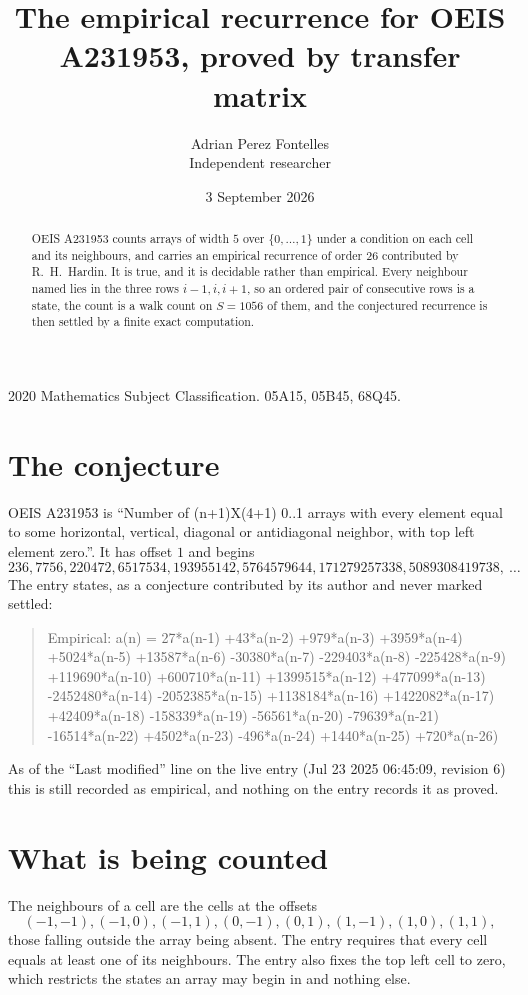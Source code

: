\documentclass[11pt,a4paper]{article}
\title{The empirical recurrence for OEIS A231953, proved by transfer matrix}
\author{Adrian Perez Fontelles\\ \small Independent researcher}
\date{3 September 2026}
\theoremstyle{plain}
\theoremstyle{definition}
\begin{document}
\maketitle

\begin{abstract}
OEIS A231953 counts arrays of width $5$ over $\{0,\dots,1\}$ under a condition on each cell
and its neighbours, and carries an empirical recurrence of order $26$ contributed by
R.~H.~Hardin. It is true, and it is decidable rather than empirical. Every neighbour named lies
in the three rows $i-1,i,i+1$, so an ordered pair of consecutive rows is a state, the count is
a walk count on $S=1056$ of them, and the conjectured recurrence is then settled by a finite
exact computation.
\end{abstract}

\noindent\small 2020 Mathematics Subject Classification. 05A15, 05B45, 68Q45.\normalsize

\section{The conjecture}

OEIS A231953 is ``Number of (n+1)X(4+1) 0..1 arrays with every element equal to some horizontal, vertical, diagonal or antidiagonal neighbor, with top left element zero.''. It has offset $1$ and begins
\[
236, 7756, 220472, 6517534, 193955142, 5764579644, 171279257338, 5089308419738,\ \dots
\]
The entry states, as a conjecture contributed by its author and never marked settled:
\begin{quote}
Empirical: a(n) = 27*a(n-1) +43*a(n-2) +979*a(n-3) +3959*a(n-4) +5024*a(n-5) +13587*a(n-6) -30380*a(n-7) -229403*a(n-8) -225428*a(n-9) +119690*a(n-10) +600710*a(n-11) +1399515*a(n-12) +477099*a(n-13) -2452480*a(n-14) -2052385*a(n-15) +1138184*a(n-16) +1422082*a(n-17) +42409*a(n-18) -158339*a(n-19) -56561*a(n-20) -79639*a(n-21) -16514*a(n-22) +4502*a(n-23) -496*a(n-24) +1440*a(n-25) +720*a(n-26)
\end{quote}
As of the ``Last modified'' line on the live entry (Jul 23 2025 06:45:09, revision 6) this is still
recorded as empirical, and nothing on the entry records it as proved.

\section{What is being counted}

The neighbours of a cell are the cells at the offsets
\[
(-1,-1), (-1,0), (-1,1), (0,-1), (0,1), (1,-1), (1,0), (1,1),
\]
those falling outside the array being absent. The entry requires that every cell equals at least one of its neighbours. The entry also fixes the top left cell to zero, which restricts the states an array may begin in and nothing else.
\end{document}
